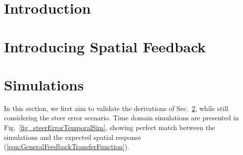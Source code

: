 \documentclass[journal]{IEEEtran}
\begin{document}
\section{Introduction}

\section{Introducing Spatial Feedback}
\label{sec_introduceFeedback}

\section{Simulations}
In this section, we first aim to validate the derivations of Sec.~\ref{sec_introduceFeedback}, while still considering the steer error scenario. Time domain simulations are presented in Fig.~\ref{fig_steerErrorTemporalSim}, showing perfect match between the simulations and the expected spatial response (\ref{eqn:GeneralFeedbackTransferFunction}).
\end{document}
